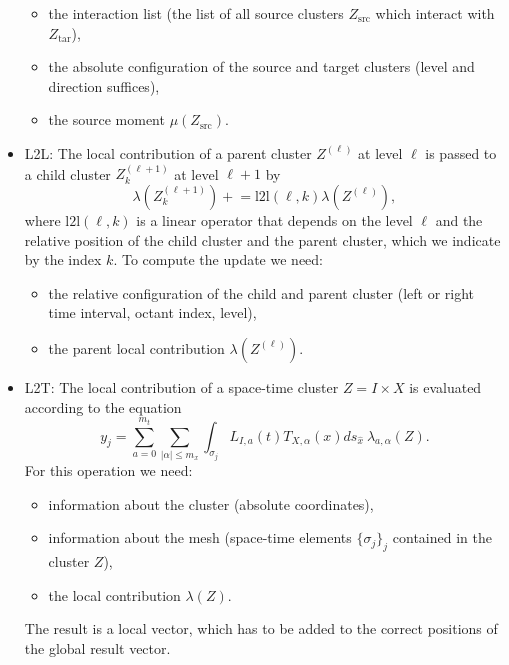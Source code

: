 \documentclass[a4paper,11pt]{article}
\theoremstyle{plain}
\theoremstyle{definition}
\theoremstyle{remark}
\newcommand{\pluseq}{\mathrel{+}=}
\begin{document}
\begin{itemize}
    \begin{itemize}
      \item the interaction list (the list of all source clusters $Z_{\mathrm{src}}$ which interact with 
      $Z_{\mathrm{tar}}$),
      \item the absolute configuration of the source and target clusters (level and direction suffices),
      \item the source moment $\mu(Z_{\mathrm{src}})$.
    \end{itemize}
  \item L2L: The local contribution of a parent cluster $Z^{(\ell)}$ at level $\ell$ is passed to a child cluster 
  $Z_{k}^{(\ell+1)}$ at level $\ell+1$ by
  \begin{equation*}
    \lambda(Z_{k}^{(\ell+1)}) \pluseq \mathrm{l2l}(\ell, k) \lambda(Z^{(\ell)}),
  \end{equation*}
  where $\mathrm{l2l}(\ell, k)$ is a linear operator that depends on the level $\ell$ and the relative position of
  the child cluster and the parent cluster, which we indicate by the index $k$. To compute the update we need:
  \begin{itemize}
    \item the relative configuration of the child and parent cluster (left or right time interval, octant index, level),
    \item the parent local contribution $\lambda(Z^{(\ell)})$.
  \end{itemize}
  \item L2T: The local contribution of a space-time cluster $Z = I \times X$ is evaluated according to the equation 
    \begin{equation*}
      y_j = \sum_{a=0}^{m_t} \sum_{|\alpha|\leq m_x} 
        \int_{\sigma_j} L_{I,a}(t) T_{X,\alpha}(x) ds_{\hat{x}}\ \lambda_{a, \alpha}(Z).
    \end{equation*}
    For this operation we need:
    \begin{itemize}
      \item information about the cluster (absolute coordinates),
      \item information about the mesh (space-time elements $\{\sigma_j\}_j$ contained in the cluster $Z$),
      \item the local contribution $\lambda(Z)$.
    \end{itemize}
    The result is a local vector, which has to be added to the correct positions of the global result vector.
\end{itemize}
\newpage
\end{document}
